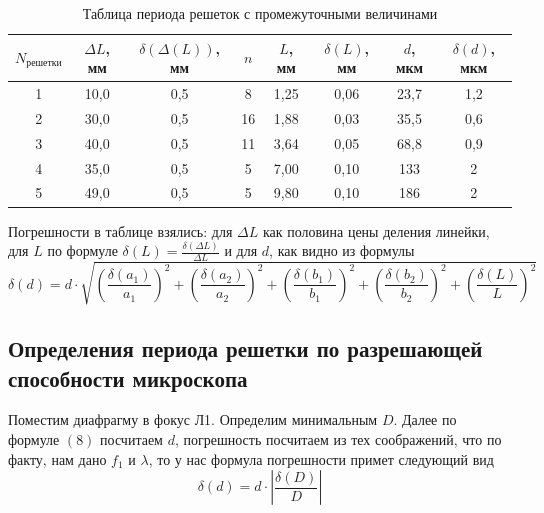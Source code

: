 \documentclass[a4paper, 12pt]{article}%
\begin{document}
\begin{enumerate}
\begin{table}[h!]
\begin{center}
\begin{tabular}{|c|c|c|c|c|c|c|c|}
\hline
$N_{\text{решетки}}$ & $\Delta L$, мм & $\delta(\Delta(L))$, мм & $n$ & $L$, мм & $\delta(L)$, мм & $d$, мкм & $\delta(d)$, мкм \\ \hline
1                    & 10,0           & 0,5                     & 8   & 1,25    & 0,06            & 23,7     & 1,2              \\ \hline
2                    & 30,0           & 0,5                     & 16  & 1,88    & 0,03            & 35,5     & 0,6              \\ \hline
3                    & 40,0           & 0,5                     & 11  & 3,64    & 0,05            & 68,8     & 0,9              \\ \hline
4                    & 35,0           & 0,5                     & 5   & 7,00    & 0,10            & 133      & 2                \\ \hline
5                    & 49,0           & 0,5                     & 5   & 9,80    & 0,10            & 186      & 2                \\ \hline
\end{tabular}
\caption{Таблица периода решеток с промежуточными величинами}
\end{center}
\end{table}
\end{enumerate}

Погрешности в таблице взялись: для $\Delta L$ как половина цены деления линейки, для $L$ по формуле $\delta(L) = \frac{\delta(\Delta L)}{\Delta L}$ и для $d$, как видно из формулы
\[\delta(d) = d \cdot \sqrt{\left( \dfrac{\delta(a_1)}{a_1}\right)^2+\left( \dfrac{\delta(a_2)}{a_2}\right)^2+\left( \dfrac{\delta(b_1)}{b_1}\right)^2 + \left( \dfrac{\delta(b_2)}{b_2}\right)^2 + \left( \dfrac{\delta(L)}{L}\right)^2}\]
\subsection{Определения периода решетки по разрешающей способности микроскопа}
Поместим диафрагму в фокус Л1. Определим минимальным $D$. Далее по формуле $(8)$ посчитаем $d$, погрешность посчитаем из тех соображений, что по факту, нам дано $f_1$ и $\lambda$, то у нас формула погрешности примет следующий вид 
\[\delta(d) = d \cdot \left| \dfrac{\delta(D)}{D}\right|\]
\end{document}
